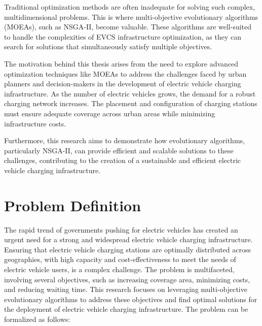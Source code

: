 Traditional optimization methods are often inadequate for solving such complex, multidimensional problems. This is where multi-objective evolutionary algorithms (MOEAs), such as NSGA-II, become valuable. These algorithms are well-suited to handle the complexities of EVCS infrastructure optimization, as they can search for solutions that simultaneously satisfy multiple objectives.

The motivation behind this thesis arises from the need to explore advanced optimization techniques like MOEAs to address the challenges faced by urban planners and decision-makers in the development of electric vehicle charging infrastructure. As the number of electric vehicles grows, the demand for a robust charging network increases. The placement and configuration of charging stations must ensure adequate coverage across urban areas while minimizing infrastructure costs.

Furthermore, this research aims to demonstrate how evolutionary algorithms, particularly NSGA-II, can provide efficient and scalable solutions to these challenges, contributing to the creation of a sustainable and efficient electric vehicle charging infrastructure.

\section{Problem Definition}

The rapid trend of governments pushing for electric vehicles has created an urgent need for a strong and widespread electric vehicle charging infrastructure. Ensuring that electric vehicle charging stations are optimally distributed across geographies, with high capacity and cost-effectiveness to meet the needs of electric vehicle users, is a complex challenge. The problem is multifaceted, involving several objectives, such as increasing coverage area, minimizing costs, and reducing waiting time. This research focuses on leveraging multi-objective evolutionary algorithms to address these objectives and find optimal solutions for the deployment of electric vehicle charging infrastructure. The problem can be formalized as follows:

